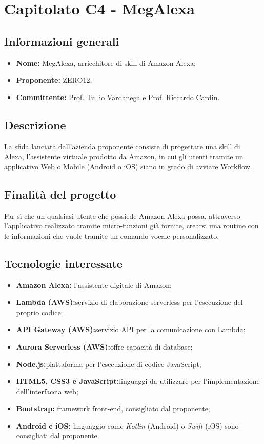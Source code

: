 \documentclass[a4paper, 11pt]{article}
\begin{document}
	\section{Capitolato C4 - MegAlexa}
	\subsection{Informazioni generali}
	\begin{itemize}
		\item \textbf{Nome: }MegAlexa, arricchitore di skill di Amazon Alexa;
		\item \textbf{Proponente: }ZERO12;
		\item \textbf{Committente: } Prof. Tullio Vardanega e Prof. Riccardo Cardin.
	\end{itemize}
	\subsection{Descrizione}
		La sfida lanciata dall’azienda proponente consiste di progettare una skill di Alexa, l’assistente virtuale prodotto da 				Amazon, in cui gli utenti tramite un applicativo Web o Mobile (Android o iOS) siano in grado di avviare Workflow.
	\subsection{Finalità del progetto}
		Far sì che un qualsiasi utente che possiede Amazon Alexa possa, attraverso l’applicativo realizzato tramite micro-funzioni 			già fornite, crearsi una routine con le informazioni che vuole tramite un comando vocale personalizzato.
	\subsection{Tecnologie interessate}
	\begin{itemize}
		\item \textbf{Amazon Alexa:} l'assistente digitale di Amazon;
		\item \textbf{Lambda (AWS):}servizio di elaborazione serverless per l'esecuzione del proprio codice; 
		\item \textbf{API Gateway (AWS):}servizio API per la comunicazione con Lambda;
		\item \textbf{Aurora Serverless (AWS):}offre capacità di database;
		\item \textbf{Node.js:}piattaforma per l'esecuzione di codice JavaScript;
		\item \textbf{HTML5, CSS3 e JavaScript:}linguaggi da utilizzare per l'implementazione dell'interfaccia web;
		\item \textbf{Bootstrap:} framework front-end, consigliato dal proponente;
		\item \textbf{Android e iOS:} linguaggio come \textit{Kotlin} (Android) o \textit{Swift} (iOS) sono consigliati dal proponente.
	\end{itemize}
\end{document}
